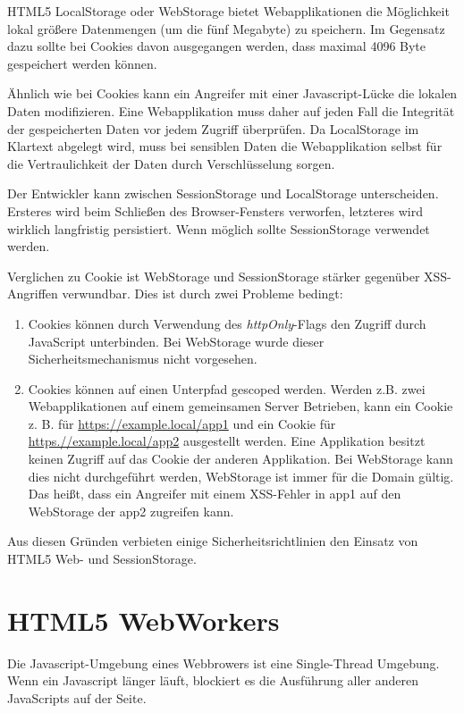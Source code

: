 HTML5 LocalStorage oder WebStorage bietet Webapplikationen die Möglichkeit lokal größere Datenmengen (um die fünf Megabyte) zu speichern. Im Gegensatz dazu sollte bei Cookies davon ausgegangen werden, dass maximal 4096 Byte gespeichert werden können.

Ähnlich wie bei Cookies kann ein Angreifer mit einer Javascript-Lücke die lokalen Daten modifizieren. Eine Webapplikation muss daher auf jeden Fall die Integrität der gespeicherten Daten vor jedem Zugriff überprüfen. Da LocalStorage im Klartext abgelegt wird, muss bei sensiblen Daten die Webapplikation selbst für die Vertraulichkeit der Daten durch Verschlüsselung sorgen.

Der Entwickler kann zwischen SessionStorage und LocalStorage unterscheiden. Ersteres wird beim Schließen des Browser-Fensters verworfen, letzteres wird wirklich langfristig persistiert. Wenn möglich sollte SessionStorage verwendet werden.

Verglichen zu Cookie ist WebStorage und SessionStorage stärker gegenüber XSS-Angriffen verwundbar. Dies ist durch zwei Probleme bedingt:

\begin{enumerate}
\item Cookies können durch Verwendung des \textit{httpOnly}-Flags den Zugriff durch JavaScript unterbinden. Bei WebStorage wurde dieser Sicherheitsmechanismus nicht vorgesehen.
\item Cookies können auf einen Unterpfad gescoped werden. Werden z.B. zwei Webapplikationen auf einem gemeinsamen Server Betrieben, kann ein Cookie z. B. für \url{https://example.local/app1} und ein Cookie für \url{https.//example.local/app2} ausgestellt werden. Eine Applikation besitzt keinen Zugriff auf das Cookie der anderen Applikation. Bei WebStorage kann dies nicht durchgeführt werden, WebStorage ist immer für die Domain gültig. Das heißt, dass ein Angreifer mit einem XSS-Fehler in app1 auf den WebStorage der app2 zugreifen kann.
\end{enumerate}

Aus diesen Gründen verbieten einige Sicherheitsrichtlinien den Einsatz von HTML5 Web- und SessionStorage.

\section{HTML5 WebWorkers}

Die Javascript-Umgebung eines Webbrowers ist eine Single-Thread Umgebung. Wenn ein Javascript länger läuft, blockiert es die Ausführung aller anderen JavaScripts auf der Seite.

